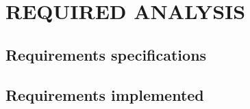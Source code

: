 \section{REQUIRED ANALYSIS}
\subsection{Requirements specifications}

\subsection{Requirements implemented}